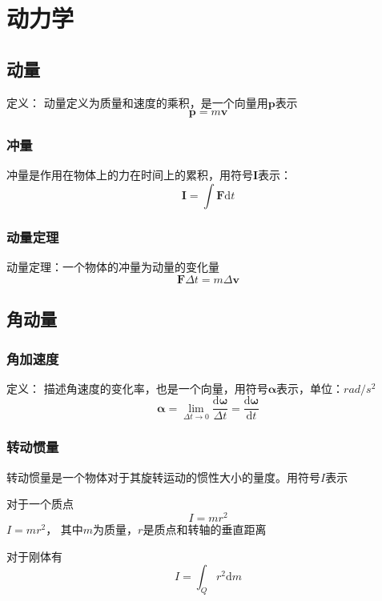 \documentclass[a4paper,oneside,11pt]{article}
\newcommand{\bol}[1]{\textbf{#1}}
\newcommand{\diff}{\mathrm{d}}
\begin{document}
\section{动力学}
\subsection{动量}
定义： 动量定义为质量和速度的乘积，是一个向量用$\bol{p}$表示
\begin{displaymath}
	\bol{p} = m\bol{v}
\end{displaymath}
\subsubsection{冲量}
冲量是作用在物体上的力在时间上的累积，用符号$\bol{I}$表示：
\begin{displaymath}
	\bol{I} = \int\bol{F}\diff t
\end{displaymath}
\subsubsection{动量定理}
动量定理：一个物体的冲量为动量的变化量
\begin{displaymath}
	\bol{F}\Delta t = m\Delta\bol{v}
\end{displaymath}
\subsection{角动量}
\subsubsection{角加速度}
定义： 描述角速度的变化率，也是一个向量，用符号$\boldsymbol{\alpha}$表示，单位：$rad/s^2$
\begin{displaymath}
	\boldsymbol{\alpha} = \lim_{\Delta t \to 0}\frac{\diff\boldsymbol{\omega}}{\Delta t} = 
	\frac{\diff \boldsymbol{\omega}}{\diff t}
\end{displaymath}
\subsubsection{转动惯量}
转动惯量是一个物体对于其旋转运动的惯性大小的量度。用符号$I$表示
\par 对于一个质点
\begin{displaymath}
	I = mr^2
\end{displaymath}
$I = mr^2$，
其中$m$为质量，$r$是质点和转轴的垂直距离
\par 对于刚体有
\begin{displaymath}
	I = \int_Q r^2\diff m
\end{displaymath}
\end{document}
